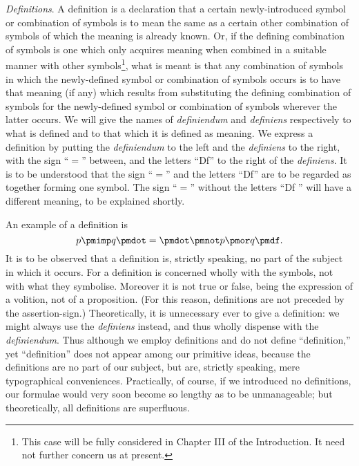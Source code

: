 \documentclass[letterpaper,12pt,openany,leqno]{book}
\newcommand{\pagefirst}[1]{\marginnote[\boxed{\text{#1}}]{\boxed{\text{#1}}}}
\begin{document}
\textit{Definitions}. A definition is a declaration that a certain newly-introduced symbol or combination of symbols is to mean the same as a certain other combination of symbols of which the meaning is already known. Or, if the defining combination of symbols is one which only acquires meaning when combined in a suitable manner with other symbols\footnote{This case will be fully considered in Chapter III of the Introduction. It need not further concern us at present.}, what is meant is that any combination of symbols in which the newly-defined symbol or combination of symbols occurs is to have that meaning (if any) which results from substituting the defining combination of symbols for the newly-defined symbol or combination of symbols wherever the latter occurs. We will give the names of \textit{definiendum} and \textit{definiens} respectively to what is defined and to that which it is defined as meaning. We express a definition by putting the \textit{definiendum} to the left and the \textit{definiens} to the right, with the sign ``$=$'' between, and the letters ``Df'' to the right of the \textit{definiens}. It is to be understood that the sign ``$=$'' and the letters ``Df'' are to be regarded as together forming one symbol. The sign ``$=$'' without the letters ``Df '' will have a different meaning, to be explained shortly.

An example of a definition is
\[ 
	p \pmimp q \pmdot = \pmdot \pmnot p \pmor q \pmdf.
\]
It is to be observed that a definition is, strictly speaking, no part of the subject in which it occurs. For a definition is concerned wholly with the symbols, not with what they symbolise. Moreover it is not true or false, being the expression of a volition, not of a proposition. (For this reason, \pagefirst{12} definitions are not preceded by the assertion-sign.) Theoretically, it is unnecessary ever to give a definition: we might always use the \textit{definiens} instead, and thus wholly dispense with the \textit{definiendum}. Thus although we employ definitions and do not define ``definition,'' yet ``definition'' does not appear among our primitive ideas, because the definitions are no part of our subject, but are, strictly speaking, mere typographical conveniences. Practically, of course, if we introduced no definitions, our formulae would very soon become so lengthy as to be unmanageable; but theoretically, all definitions are superfluous.
\end{document}
